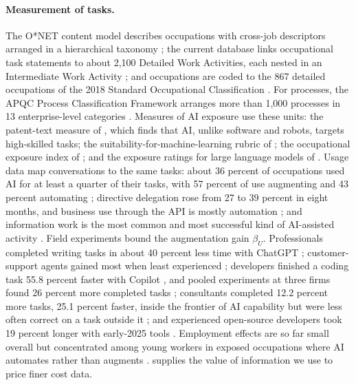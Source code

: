 \paragraph{Measurement of tasks.} The O*NET content model describes occupations with cross-job descriptors arranged in a hierarchical taxonomy \citep{peterson2001understanding}; the current database links occupational task statements to about 2,100 Detailed Work Activities, each nested in an Intermediate Work Activity \citep{onet2026database}; and occupations are coded to the 867 detailed occupations of the 2018 Standard Occupational Classification \citep{bls2017soc}. For processes, the APQC Process Classification Framework arranges more than 1,000 processes in 13 enterprise-level categories \citep{apqc2024process}. Measures of AI exposure use these units: the patent-text measure of \citet{webb2020impact}, which finds that AI, unlike software and robots, targets high-skilled tasks; the suitability-for-machine-learning rubric of \citet{brynjolfsson2018what}; the occupational exposure index of \citet{felten2021occupational}; and the exposure ratings for large language models of \citet{eloundou2024gpts}. Usage data map conversations to the same tasks: about 36 percent of occupations used AI for at least a quarter of their tasks, with 57 percent of use augmenting and 43 percent automating \citep{handa2025which}; directive delegation rose from 27 to 39 percent in eight months, and business use through the API is mostly automation \citep{appel2025anthropic}; and information work is the most common and most successful kind of AI-assisted activity \citep{tomlinson2025working}. Field experiments bound the augmentation gain $\beta_U$. Professionals completed writing tasks in about 40 percent less time with ChatGPT \citep{noy2023experimental}; customer-support agents gained most when least experienced \citep{brynjolfsson2025generative}; developers finished a coding task 55.8 percent faster with Copilot \citep{peng2023impact}, and pooled experiments at three firms found 26 percent more completed tasks \citep{cui2024effects}; consultants completed 12.2 percent more tasks, 25.1 percent faster, inside the frontier of AI capability but were less often correct on a task outside it \citep{dellacqua2026navigating}; and experienced open-source developers took 19 percent longer with early-2025 tools \citep{becker2025measuring}. Employment effects are so far small overall \citep{acemoglu2022artificial,humlum2025still} but concentrated among young workers in exposed occupations where AI automates rather than augments \citep{brynjolfsson2025canaries}. \citet{howard1966information} supplies the value of information we use to price finer cost data.

